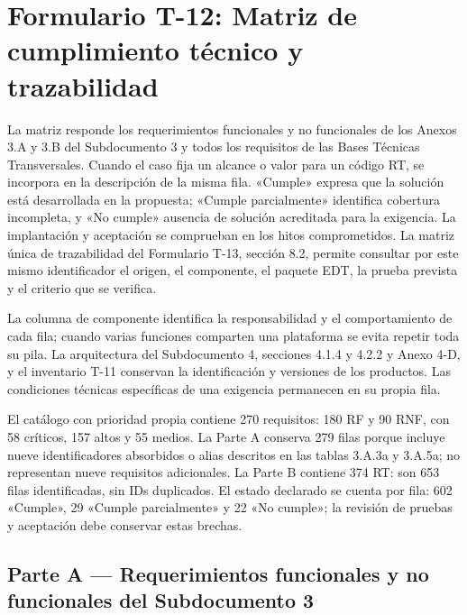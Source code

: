 \documentclass[carta,firma,final]{lafrox}
\begin{document}
\portadalafrox
\indicelafrox
\listatablaslafrox

\chapter*{Formulario T-12: Matriz de cumplimiento técnico y trazabilidad}

La matriz responde los requerimientos funcionales y no funcionales de los Anexos 3.A y 3.B del Subdocumento 3 y todos los requisitos de las Bases Técnicas Transversales. Cuando el caso fija un alcance o valor para un código RT, se incorpora en la descripción de la misma fila. «Cumple» expresa que la solución está desarrollada en la propuesta; «Cumple parcialmente» identifica cobertura incompleta, y «No cumple» ausencia de solución acreditada para la exigencia. La implantación y aceptación se comprueban en los hitos comprometidos. La matriz única de trazabilidad del Formulario T-13, sección 8.2, permite consultar por este mismo identificador el origen, el componente, el paquete EDT, la prueba prevista y el criterio que se verifica.

La columna de componente identifica la responsabilidad y el comportamiento de cada fila; cuando varias funciones comparten una plataforma se evita repetir toda su pila. La arquitectura del Subdocumento 4, secciones 4.1.4 y 4.2.2 y Anexo 4-D, y el inventario T-11 conservan la identificación y versiones de los productos. Las condiciones técnicas específicas de una exigencia permanecen en su propia fila.

El catálogo con prioridad propia contiene 270 requisitos: 180 RF y 90 RNF, con 58 críticos, 157 altos y 55 medios. La Parte A conserva 279 filas porque incluye nueve identificadores absorbidos o alias descritos en las tablas 3.A.3a y 3.A.5a; no representan nueve requisitos adicionales. La Parte B contiene 374 RT: son 653 filas identificadas, sin IDs duplicados. El estado declarado se cuenta por fila: 602 «Cumple», 29 «Cumple parcialmente» y 22 «No cumple»; la revisión de pruebas y aceptación debe conservar estas brechas.

\section*{Parte A — Requerimientos funcionales y no funcionales del Subdocumento 3}
\end{document}
